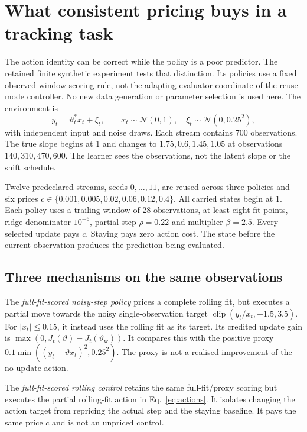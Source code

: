 \section{What consistent pricing buys in a tracking task}
\label{sec:numerical-demonstrations}

The action identity can be correct while the policy is a poor predictor. The retained finite synthetic experiment tests that distinction. Its policies use a fixed observed-window scoring rule, not the adapting evaluator coordinate of the reuse-mode controller. No new data generation or parameter selection is used here. The environment is
\begin{equation}
 y_t=\vartheta_t^*x_t+\xi_t,\qquad
 x_t\sim\mathcal N(0,1),\quad
 \xi_t\sim\mathcal N(0,0.25^2),
 \label{eq:num-toy-two-scale-data}
\end{equation}
with independent input and noise draws. Each stream contains 700 observations. The true slope begins at 1 and changes to \(1.75,0.6,1.45,1.05\) at observations \(140,310,470,600\). The learner sees the observations, not the latent slope or the shift schedule.

Twelve predeclared streams, seeds \(0,\ldots,11\), are reused across three policies and six prices
\(c\in\{0.001,0.005,0.02,0.06,0.12,0.4\}\).
All carried states begin at 1. Each policy uses a trailing window of 28 observations, at least eight fit points, ridge denominator \(10^{-6}\), partial step \(\rho=0.22\) and multiplier \(\beta=2.5\). Every selected update pays \(c\). Staying pays zero action cost. The state before the current observation produces the prediction being evaluated.

\subsection{Three mechanisms on the same observations}

The \emph{full-fit-scored noisy-step policy} prices a complete rolling fit, but executes a partial move towards the noisy single-observation target
\(\operatorname{clip}(y_t/x_t,-1.5,3.5)\).
For \(|x_t|\leq0.15\), it instead uses the rolling fit as its target. Its credited update gain is
\(\max(0,J_t(\vartheta)-J_t(\vartheta_{\mathrm w}))\).
It compares this with the positive proxy
\(0.1\min((y_t-\vartheta x_t)^2,0.25^2)\).
The proxy is not a realised improvement of the no-update action.

The \emph{full-fit-scored rolling control} retains the same full-fit/proxy scoring but executes the partial rolling-fit action in Eq.~\eqref{eq:actions}. It isolates changing the action target from repricing the actual step and the staying baseline. It pays the same price \(c\) and is not an unpriced control.

